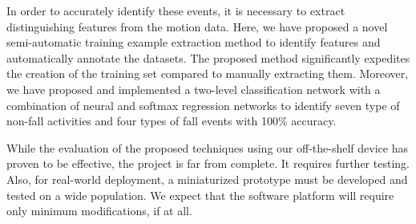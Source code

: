 \documentclass[]{IEEEtran}
\begin{document}
In order to accurately identify these events, it is necessary to extract distinguishing features from the motion data. Here, we have proposed a novel semi-automatic training example extraction method to identify features and automatically annotate the datasets. The proposed method significantly  expedites the creation of the training set compared to manually extracting them. Moreover, we have proposed and implemented a two-level classification network with  a combination of neural and softmax regression networks to identify seven type of non-fall activities and four types of fall events with 100\% accuracy. 

While the evaluation of the proposed techniques using our off-the-shelf device has proven to be effective, the project is far from complete. It requires further testing. Also, for real-world deployment, a miniaturized prototype must be developed and tested on a wide population. We expect that the software platform will require only minimum modifications, if at all.




\end{document}

